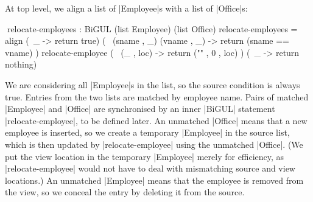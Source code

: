 \documentclass{sigplanconf}
\begin{document}
At top level, we align a list of |Employee|s with a list of |Office|s:
\begin{code}
^^^relocate-employees : BiGUL (list Employee) (list Office)
relocate-employees = align
  (\ _ -> return true)
  (\ { (sname , _) (vname , _) -> return (sname == vname) })
  relocate-employee
  (\ { (_ , loc) -> return ("" , 0 , loc) })
  (\ _ -> return nothing)
\end{code}
We are considering all |Employee|s in the list, so the source condition is always true.
Entries from the two lists are matched by employee name.
Pairs of matched |Employee| and |Office| are synchronised by an inner |BiGUL| statement |relocate-employee|, to be defined later.
An unmatched |Office| means that a new employee is inserted, so we create a temporary |Employee| in the source list, which is then updated by |relocate-employee| using the unmatched |Office|.
(We put the view location in the temporary |Employee| merely for efficiency, as |relocate-employee| would not have to deal with mismatching source and view locations.)
An unmatched |Employee| means that the employee is removed from the view, so we conceal the entry by deleting it from the source.
\end{document}
